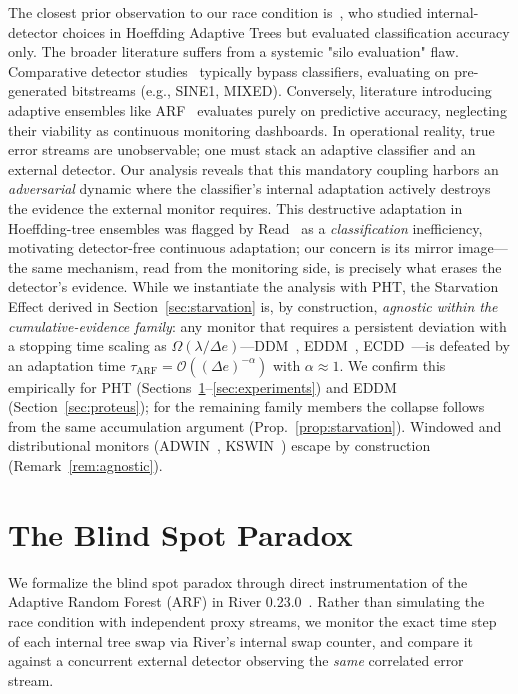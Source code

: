 \documentclass[10pt,conference]{IEEEtran}
\theoremstyle{definition}
\begin{document}
The closest prior observation to our race condition is~\cite{stirling_2018}, who studied internal-detector choices in Hoeffding Adaptive Trees but evaluated classification accuracy only.
The broader literature suffers from a systemic "silo evaluation" flaw. Comparative detector studies~\cite{goncalves_2014, lukats_2025} typically bypass classifiers, evaluating on pre-generated bitstreams (e.g., SINE1, MIXED). Conversely, literature introducing adaptive ensembles like ARF~\cite{gomes_arf_2017} evaluates purely on predictive accuracy, neglecting their viability as continuous monitoring dashboards. In operational reality, true error streams are unobservable; one must stack an adaptive classifier and an external detector. Our analysis reveals that this mandatory coupling harbors an \emph{adversarial} dynamic where the classifier's internal adaptation actively destroys the evidence the external monitor requires. This destructive adaptation in Hoeffding-tree ensembles was flagged by Read~\cite{read_2018} as a \emph{classification} inefficiency, motivating detector-free continuous adaptation; our concern is its mirror image---the same mechanism, read from the monitoring side, is precisely what erases the detector's evidence. While we instantiate the analysis with PHT, the Starvation Effect derived in Section~\ref{sec:starvation} is, by construction, \emph{agnostic within the cumulative-evidence family}: any monitor that requires a persistent deviation with a stopping time scaling as $\Omega(\lambda / \Delta e)$---DDM~\cite{gama_ddm_2004}, EDDM~\cite{baena_eddm_2006}, ECDD~\cite{ross_ecdd_2012}---is defeated by an adaptation time $\tau_{\mathrm{ARF}} = \mathcal{O}((\Delta e)^{-\alpha})$ with $\alpha \approx 1$. We confirm this empirically for PHT (Sections~\ref{sec:blindspot}--\ref{sec:experiments}) and EDDM (Section~\ref{sec:proteus}); for the remaining family members the collapse follows from the same accumulation argument (Prop.~\ref{prop:starvation}). Windowed and distributional monitors (ADWIN~\cite{bifet_adwin_2007}, KSWIN~\cite{raab_kswin_2020}) escape by construction (Remark~\ref{rem:agnostic}).

\section{The Blind Spot Paradox}\label{sec:blindspot}

We formalize the blind spot paradox through direct instrumentation of the Adaptive Random Forest (ARF) in River 0.23.0~\cite{montiel_river_2021}.
Rather than simulating the race condition with independent proxy streams, we monitor the exact time step of each internal tree swap via River's internal swap counter, and compare it against a concurrent external detector observing the \emph{same} correlated error stream.
\end{document}
